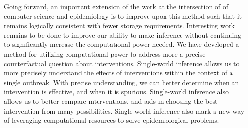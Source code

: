 \documentclass[PTRSB]{rsos}
\begin{document}
Going forward, an important extension of the work at the intersection of of computer science and epidemiology is to improve upon this method such that it remains logically consistent with fewer storage requirements. 
Interesting work remains to be done to improve our ability to make inference without continuing to significantly increase the computational power needed.
We have developed a method for utilizing computational power to address more a precise counterfactual question about interventions. 
Single-world inference allows us to more precisely understand the effects of interventions within the context of a single outbreak. 
With precise understanding, we can better determine when an intervention is effective, and when it is spurious.
Single-world inference also allows us to better compare interventions, and aids in choosing the best intervention from many possibilities. 
Single-world inference also mark a new way of leveraging computational resources to solve epidemiological problems.

\enlargethispage{20pt}











\end{document}
